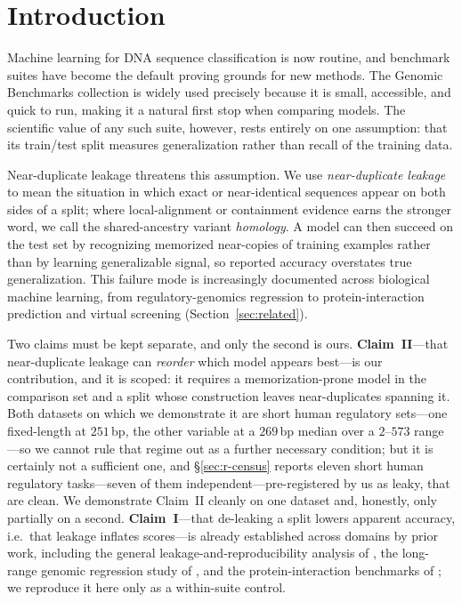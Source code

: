 \documentclass[webpdf,modern,large,namedate]{oup-authoring-template}%
\begin{document}

\maketitle

\section{Introduction}

Machine learning for DNA sequence classification is now routine, and benchmark suites have become the default proving grounds for new methods. The Genomic Benchmarks collection \citep{gresova2023} is widely used precisely because it is small, accessible, and quick to run, making it a natural first stop when comparing models. The scientific value of any such suite, however, rests entirely on one assumption: that its train/test split measures generalization rather than recall of the training data.

Near-duplicate leakage threatens this assumption. We use \emph{near-duplicate leakage} to mean the situation in which exact or near-identical sequences appear on both sides of a split; where local-alignment or containment evidence earns the stronger word, we call the shared-ancestry variant \emph{homology}. A model can then succeed on the test set by recognizing memorized near-copies of training examples rather than by learning generalizable signal, so reported accuracy overstates true generalization. This failure mode is increasingly documented across biological machine learning, from regulatory-genomics regression to protein-interaction prediction and virtual screening (Section~\ref{sec:related}).

Two claims must be kept separate, and only the second is ours. \textbf{Claim~II}---that near-duplicate leakage can \emph{reorder} which model appears best---is our contribution, and it is scoped: it requires a memorization-prone model in the comparison set and a split whose construction leaves near-duplicates spanning it. Both datasets on which we demonstrate it are short human regulatory sets---one fixed-length at $251$\,bp, the other variable at a $269$\,bp median over a $2$--$573$ range---so we cannot rule that regime out as a further necessary condition; but it is certainly not a sufficient one, and \S\ref{sec:r-census} reports eleven short human regulatory tasks---seven of them independent---pre-registered by us as leaky, that are clean. We demonstrate Claim~II cleanly on one dataset and, honestly, only partially on a second. \textbf{Claim~I}---that de-leaking a split lowers apparent accuracy, i.e.\ that leakage inflates scores---is already established across domains by prior work, including the general leakage-and-reproducibility analysis of \citet{kapoor2023leakage}, the long-range genomic regression study of \citet{rafi2025}, and the protein-interaction benchmarks of \citet{bushuiev2024}; we reproduce it here only as a within-suite control.
\end{document}
